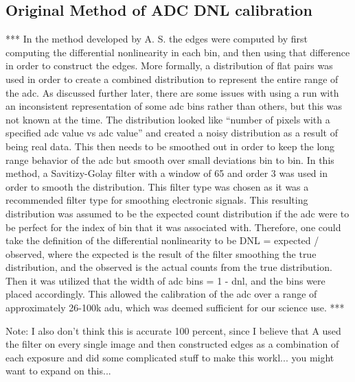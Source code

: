 \documentclass[11pt, letterpaper]{article}
\begin{document}
\subsection{Original Method of ADC DNL calibration}
***
In the method developed by A. S. the edges were computed by first computing the differential nonlinearity in each bin, and then using that difference in order to construct the edges. More formally, a distribution of flat pairs was used in order to create a combined distribution to represent the entire range of the adc. As discussed further later, there are some issues with using a run with an inconsistent representation of some adc bins rather than others, but this was not known at the time. The distribution looked like “number of pixels with a specified adc value vs adc value” and created a noisy distribution as a result of being real data. This then needs to be smoothed out in order to keep the long range behavior of the adc but smooth over small deviations bin to bin. In this method, a Savitizy-Golay filter with a window of 65 and order 3 was used in order to smooth the distribution. This filter type was chosen as it was a recommended filter type for smoothing electronic signals. This resulting distribution was assumed to be the expected count distribution if the adc were to be perfect for the index of bin that it was associated with. Therefore, one could take the definition of the differential nonlinearity to be DNL = expected / observed, where the expected is the result of the filter smoothing the true distribution, and the observed is the actual counts from the true distribution. Then it was utilized that the width of adc bins = 1 - dnl, and the bins were placed accordingly. This allowed the calibration of the adc over a range of approximately 26-100k adu, which was deemed sufficient for our science use. 
*** 

Note: I also don't think this is accurate 100 percent, since I believe that A used the filter on every single image and then constructed edges as a combination of each exposure and did some complicated stuff to make this workl... you might want to expand on this... 
\end{document}
